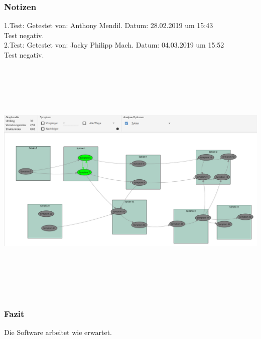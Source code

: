 \documentclass[enabledeprecatedfontcommands]{scrartcl}
\begin{document}
\subsubsection{Notizen}
1.Test: Getestet von: Anthony Mendil. Datum: 28.02.2019 um 15:43 \\
Test negativ. \\
2.Test: Getestet von: Jacky Philipp Mach. Datum: 04.03.2019 um 15:52 \\
Test negativ.
\begin{center}
\includegraphics[height=12cm, angle=90]{analysezyklen.PNG}
\end{center}
\subsubsection{Fazit}
Die Software arbeitet wie erwartet.
\end{document}

